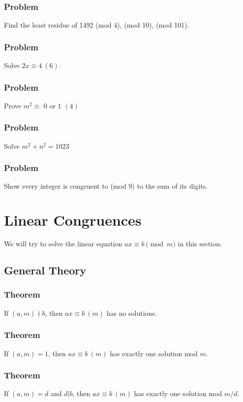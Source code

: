 \documentclass{article}
\begin{document}
\subsubsection{Problem}
Find the least residue of 1492 (mod 4), (mod 10), (mod 101).
\vspace{40px}
\subsubsection{Problem}
Solve $2x \equiv 4 \ (6)$.
\vspace{40px}
\subsubsection{Problem}
Prove $m^2 \equiv \text{ 0 or 1 } (4)$
\vspace{40px}
\subsubsection{Problem}
Solve $m^2+n^2=1023$
\vspace{40px}
\subsubsection{Problem}
Show every integer is congruent to (mod 9) to the sum of its digits.
\pagebreak

\section{Linear Congruences}
We will try to solve the linear equation $ax \equiv b \pmod{m}$ in this section.
\subsection{General Theory}
\subsubsection{Theorem}
If $(a, m) \nmid b$, then $ax \equiv b \ (m)$ has no solutions.
\vspace{50px}
\subsubsection{Theorem}
If $(a, m) = 1$, then $ax \equiv b \ (m)$ has exactly one solution mod $m$.
\vspace{50px}
\subsubsection{Theorem}
If $(a, m) = d$ and $d|b$, then $ax \equiv b \ (m)$ has exactly one solution mod $m/d$.
\vspace{50px}
\end{document}
